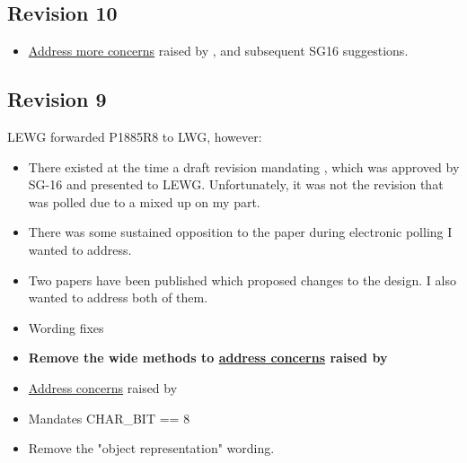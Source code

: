 \documentclass{wg21}
\begin{document}
\subsection*{Revision 10}
\begin{itemize}
\item \hyperref[P2498-concerns]{Address more concerns} raised by , and subsequent SG16 suggestions.
\end{itemize}

\subsection*{Revision 9}

LEWG forwarded P1885R8 to LWG, however:
\begin{itemize}
    \item There existed at the time a draft revision mandating , which was approved by SG-16 and presented to LEWG. Unfortunately, it was not the revision that was polled due to a mixed up on my part.
    \item There was some sustained opposition to the paper during electronic polling I wanted to address.
    \item Two papers have been published which proposed changes to the design. I also wanted to address both of them.
\end{itemize}


\begin{itemize}
    \item Wording fixes
    \item \textbf{Remove the wide methods to \hyperref[P2491-concerns]{address concerns} raised by }
    \item \hyperref[P2498-concerns]{Address concerns} raised by 

    \item Mandates CHAR_BIT == 8
    \item Remove the "object representation" wording.
\end{itemize}
\end{document}
